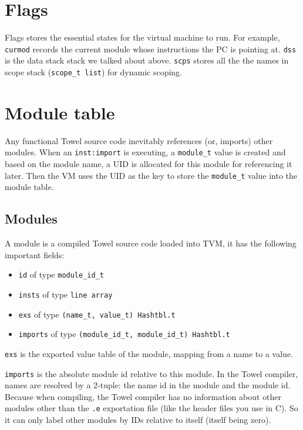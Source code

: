\documentclass{report}
\newcommand{\inst}[1] {\texttt{inst:#1}}
\begin{document}
\section{Flags}

Flags stores the essential states for the virtual machine to run. For example, \texttt{curmod} records the current module whose instructions the PC is pointing at. \texttt{dss} is the data stack stack we talked about above. \texttt{scps} stores all the the names in scope stack (\texttt{scope\_t list}) for dynamic scoping.

\section{Module table}

Any functional Towel source code inevitably references (or, imports) other modules. When an \inst{import} is executing, a \texttt{module\_t} value is created and based on the module name, a UID is allocated for this module for referencing it later. Then the VM uses the UID as the key to store the \texttt{module\_t} value into the module table.

\subsection{Modules}

A module is a compiled Towel source code loaded into TVM, it has the following important fields:
\begin{itemize}
\item \texttt{id} of type \texttt{module\_id\_t}
\item \texttt{insts} of type \texttt{line array}
\item \texttt{exs} of type \texttt{(name\_t, value\_t) Hashtbl.t}
\item \texttt{imports} of type \texttt{(module\_id\_t, module\_id\_t) Hashtbl.t}
\end{itemize}

\texttt{exs} is the exported value table of the module, mapping from a name to a value.

\texttt{imports} is the absolute module id relative to this module. In the Towel compiler, names are resolved by a 2-tuple: the name id in the module and the module id. Because when compiling, the Towel compiler has no information about other modules other than the \texttt{.e} exportation file (like the header files you use in C). So it can only label other modules by IDs relative to itself (itself being zero).
\end{document}
